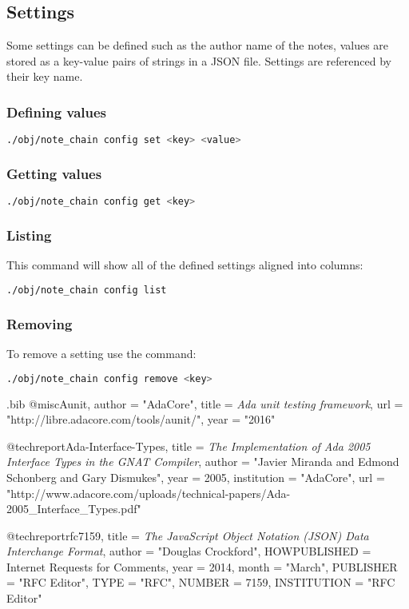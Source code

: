 \documentclass[12pt,a4paper]{article}
\begin{document}
\subsection{Settings}
Some settings can be defined such as the author name of the notes, values are
stored as a key-value pairs of strings in a JSON file. Settings are referenced
by their key name.

\subsubsection{Defining values}

\begin{lstlisting}[language=bash]
  ./obj/note_chain config set <key> <value>
\end{lstlisting}

\subsubsection{Getting values}

\begin{lstlisting}[language=bash]
  ./obj/note_chain config get <key>
\end{lstlisting}

\subsubsection{Listing}
This command will show all of the defined settings aligned into columns:

\begin{lstlisting}[language=bash]
  ./obj/note_chain config list
\end{lstlisting}

\subsubsection{Removing}
To remove a setting use the command:
\begin{lstlisting}[language=bash]
  ./obj/note_chain config remove <key>
\end{lstlisting}



\begin{filecontents}{\jobname.bib}
@misc{Aunit,
  author = "AdaCore",
  title = {\textit{Ada unit testing framework}},
  url = "http://libre.adacore.com/tools/aunit/",
  year = "2016"
}

@techreport{Ada-Interface-Types,
	title = {\textit{The Implementation of Ada 2005 Interface Types in the GNAT Compiler}},
	author = "Javier Miranda and Edmond Schonberg and Gary Dismukes",
	year = 2005,
	institution = "AdaCore",
	url = "http://www.adacore.com/uploads/technical-papers/Ada-2005_Interface_Types.pdf"
}

@techreport{rfc7159,
	title = {\textit{The JavaScript Object Notation (JSON) Data Interchange Format}},
	author = "Douglas Crockford",
	HOWPUBLISHED = {Internet Requests for Comments},
	year = 2014,
	month = "March",
	PUBLISHER = "{RFC Editor}",
	TYPE = "{RFC}",
	NUMBER = 7159,
	INSTITUTION = "{RFC Editor}"
}
\end{filecontents}



\end{document}
